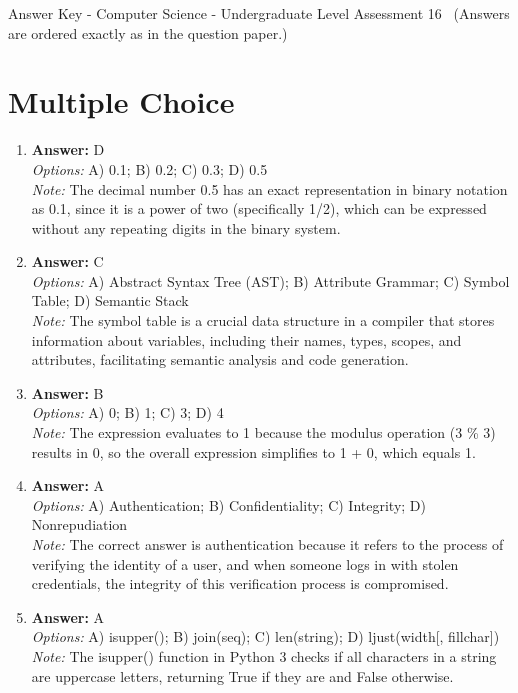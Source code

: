 \documentclass[12pt]{article}
\begin{document}
\begin{center}
Answer Key - Computer Science - Undergraduate Level Assessment 16 \
\small (Answers are ordered exactly as in the question paper.)
\end{center}

\section*{Multiple Choice}
\begin{enumerate}[label=\arabic*.]
\item \textbf{Answer:} D
\\ \textit{Options:} A) 0.1; B) 0.2; C) 0.3; D) 0.5
\\ \textit{Note:} The decimal number 0.5 has an exact representation in binary notation as 0.1, since it is a power of two (specifically 1/2), which can be expressed without any repeating digits in the binary system.
\item \textbf{Answer:} C
\\ \textit{Options:} A) Abstract Syntax Tree (AST); B) Attribute Grammar; C) Symbol Table; D) Semantic Stack
\\ \textit{Note:} The symbol table is a crucial data structure in a compiler that stores information about variables, including their names, types, scopes, and attributes, facilitating semantic analysis and code generation.
\item \textbf{Answer:} B
\\ \textit{Options:} A) 0; B) 1; C) 3; D) 4
\\ \textit{Note:} The expression evaluates to 1 because the modulus operation (3 \% 3) results in 0, so the overall expression simplifies to 1 + 0, which equals 1.
\item \textbf{Answer:} A
\\ \textit{Options:} A) Authentication; B) Confidentiality; C) Integrity; D) Nonrepudiation
\\ \textit{Note:} The correct answer is authentication because it refers to the process of verifying the identity of a user, and when someone logs in with stolen credentials, the integrity of this verification process is compromised.
\item \textbf{Answer:} A
\\ \textit{Options:} A) isupper(); B) join(seq); C) len(string); D) ljust(width[, fillchar])
\\ \textit{Note:} The isupper() function in Python 3 checks if all characters in a string are uppercase letters, returning True if they are and False otherwise.
\end{enumerate}
\end{document}
